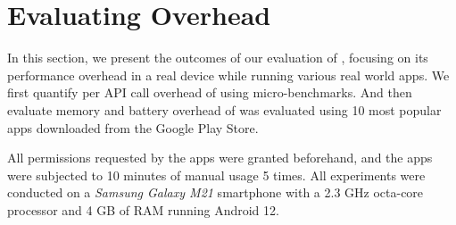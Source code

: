 \section{Evaluating Overhead}
\label{sec:results}

In this section, we present the outcomes of our evaluation of \framework{},
focusing on its performance overhead in a real device while running various real
world apps.  We first quantify per API call overhead of \framework using
micro-benchmarks. And then evaluate memory and battery overhead of \framework{}
was evaluated using 10 most popular apps downloaded from the Google
Play Store.

All permissions requested by the apps were granted beforehand, and the apps were
subjected to 10 minutes of manual usage 5 times. All experiments were conducted
on a \textit{Samsung Galaxy M21} smartphone with a 2.3 GHz octa-core processor
and 4 GB of RAM running Android 12. 

